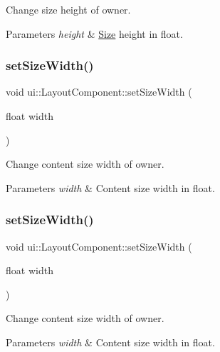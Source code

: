 Change size height of owner. 
\begin{DoxyParams}{Parameters}
{\em height} & \hyperlink{classSize}{Size} height in float. \\
\hline
\end{DoxyParams}
\mbox{\label{classui_1_1LayoutComponent_a38457ef477f1a6286021fabb7bce7ba2}} 
\subsubsection{\texorpdfstring{set\+Size\+Width()}{setSizeWidth()}\hspace{0.1cm}{\footnotesize\ttfamily [1/2]}}
{\footnotesize\ttfamily void ui\+::\+Layout\+Component\+::set\+Size\+Width (\begin{DoxyParamCaption}\item[{float}]{width }\end{DoxyParamCaption})}

Change content size width of owner. 
\begin{DoxyParams}{Parameters}
{\em width} & Content size width in float. \\
\hline
\end{DoxyParams}
\mbox{\label{classui_1_1LayoutComponent_a38457ef477f1a6286021fabb7bce7ba2}} 
\subsubsection{\texorpdfstring{set\+Size\+Width()}{setSizeWidth()}\hspace{0.1cm}{\footnotesize\ttfamily [2/2]}}
{\footnotesize\ttfamily void ui\+::\+Layout\+Component\+::set\+Size\+Width (\begin{DoxyParamCaption}\item[{float}]{width }\end{DoxyParamCaption})}

Change content size width of owner. 
\begin{DoxyParams}{Parameters}
{\em width} & Content size width in float. \\
\hline
\end{DoxyParams}
\mbox{\label{classui_1_1LayoutComponent_a65abc1aa634d8acc866c0be757ae17a9}} 
